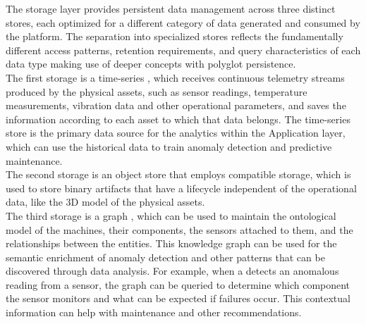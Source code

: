 The storage layer provides persistent data management across three distinct stores, each optimized for a different category of data generated and consumed by the platform. The separation into specialized stores reflects the fundamentally different access patterns, retention requirements, and query characteristics of each data type making use of deeper \DB concepts with polyglot persistence.\\
The first storage is a time-series \DB, which receives continuous telemetry streams produced by the physical assets, such as sensor readings, temperature measurements, vibration data and other operational parameters, and saves the information according to each asset to which that data belongs. The time-series store is the primary data source for the analytics within the Application layer, which can use the historical data to train anomaly detection and predictive maintenance.\\
The second storage is an object store that employs \SthreeStorage compatible storage, which is used to store binary artifacts that have a lifecycle independent of the operational data, like the 3D model of the physical assets.\\
The third storage is a graph \DB, which can be used to maintain the ontological model of the machines, their components, the sensors attached to them, and the relationships between the entities. This knowledge graph can be used for the semantic enrichment of anomaly detection and other patterns that can be discovered through data analysis. For example, when a \DTPod detects an anomalous reading from a sensor, the graph can be queried to determine which component the sensor monitors and what can be expected if failures occur. This contextual information can help with maintenance and other recommendations.

